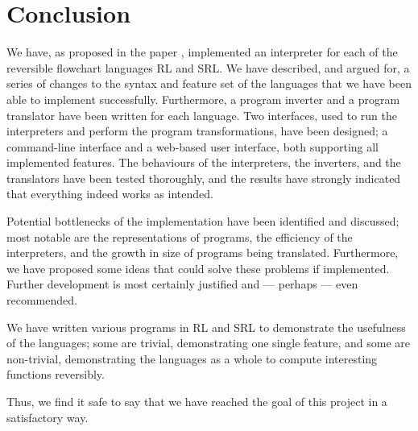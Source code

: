 \chapter*{Conclusion}
 

We have, as proposed in the paper \cite{REV}, implemented an interpreter for each of the reversible flowchart languages RL and SRL. We have described, and argued for, a series of changes to the syntax and feature set of the languages that we have been able to implement successfully. Furthermore, a program inverter and a program translator have been written for each language. Two interfaces, used to run the interpreters and perform the program transformations, have been designed; a command-line interface and a web-based user interface, both supporting all implemented features. The behaviours of the interpreters, the inverters, and the translators have been tested thoroughly, and the results have strongly indicated that everything indeed works as intended.

Potential bottlenecks of the implementation have been identified and discussed; most notable are the representations of programs, the efficiency of the interpreters, and the growth in size of programs being translated. Furthermore, we have proposed some ideas that could solve these problems if implemented. Further development is most certainly justified and --- perhaps --- even recommended.

We have written various programs in RL and SRL to demonstrate the usefulness of the languages; some are trivial, demonstrating one single feature, and some are non-trivial, demonstrating the languages as a whole to compute interesting functions reversibly.


Thus, we find it safe to say that we have reached the goal of this project in a satisfactory way. %
